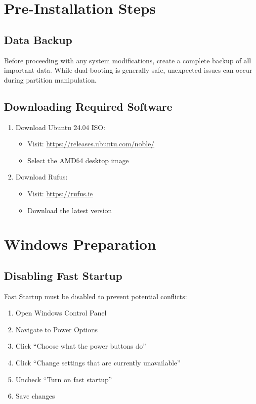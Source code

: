 \documentclass[11pt,a4paper]{article}
\newenvironment{warning}
{\begin{tcolorbox}[colback=warningcolor!10,colframe=warningcolor,title=\textbf{Warning}]}
{\end{tcolorbox}}
\newenvironment{note}
{\begin{tcolorbox}[colback=notecolor!10,colframe=notecolor,title=\textbf{Note}]}
{\end{tcolorbox}}
\begin{document}
\section{Pre-Installation Steps}
\subsection{Data Backup}
\begin{warning}
Before proceeding with any system modifications, create a complete backup of all important data. While dual-booting is generally safe, unexpected issues can occur during partition manipulation.
\end{warning}

\subsection{Downloading Required Software}
\begin{enumerate}
    \item Download Ubuntu 24.04 ISO:
    \begin{itemize}
        \item Visit: \url{https://releases.ubuntu.com/noble/}
        \item Select the AMD64 desktop image
    \end{itemize}
    \item Download Rufus:
    \begin{itemize}
        \item Visit: \url{https://rufus.ie}
        \item Download the latest version
    \end{itemize}
\end{enumerate}

\section{Windows Preparation}
\subsection{Disabling Fast Startup}
Fast Startup must be disabled to prevent potential conflicts:
\begin{enumerate}
    \item Open Windows Control Panel
    \item Navigate to Power Options
    \item Click ``Choose what the power buttons do''
    \item Click ``Change settings that are currently unavailable''
    \item Uncheck ``Turn on fast startup''
    \item Save changes
\end{enumerate}
\end{document}
